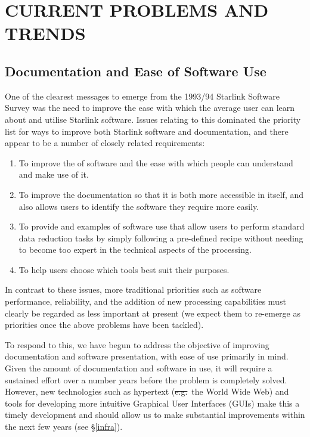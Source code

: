 \section{CURRENT PROBLEMS AND TRENDS}

\subsection{\label{started}Documentation and Ease of Software Use}

One of the clearest messages to emerge from the 1993/94 Starlink
Software Survey was the need to improve the ease with which the
average user can learn about and utilise Starlink software. Issues
relating to this dominated the priority list for ways to improve both
Starlink software and documentation, and there appear to be a number
of closely related requirements:

\begin{enumerate}
\item To improve the  of software and the ease with
which people can understand and make use of it.

\item To improve the documentation so that it is both more accessible
in itself, and also allows users to identify the software they require
more easily.

\item To provide  and examples of software use that allow
users to perform standard data reduction tasks by simply following a
pre-defined recipe without needing to become too expert in the
technical aspects of the processing.

\item To help users choose which tools best suit their purposes.
\end{enumerate}

In contrast to these issues, more traditional priorities such as
software performance, reliability, and the addition of new processing
capabilities must clearly be regarded as less important at present (we
expect them to re-emerge as priorities once the above problems have
been tackled).

To respond to this, we have begun  to address the
objective of improving documentation and software presentation, with
ease of use primarily in mind.  Given the amount of documentation and
software in use, it will require a sustained effort over a number
years before the problem is completely solved.  However, new
technologies such as hypertext (\st{e.g.}\ the World Wide Web) and
tools for developing more intuitive Graphical User Interfaces (GUIs)
make this a timely development and should allow us to make substantial
improvements within the next few years (see \S\ref{infra}).

